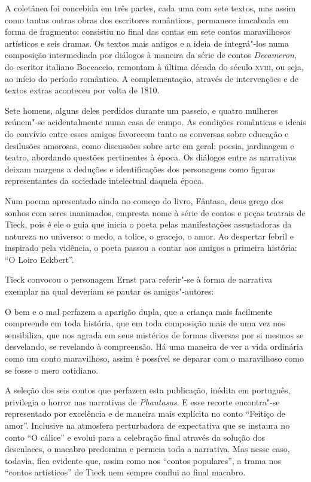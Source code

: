 A coletânea foi concebida em três partes, cada uma com sete textos,
mas assim como tantas outras obras dos escritores românticos, permanece
inacabada em forma de fragmento: consistiu no final das contas em sete
contos maravilhosos artísticos e seis dramas. Os textos mais antigos e a ideia de
integrá"-los numa composição intermediada por diálogos à maneira da
série de contos \textit{Decameron}, do escritor italiano Boccaccio,		
remontam à última década do século \textsc{xviii}, ou seja, 
ao início do período romântico. A complementação, através de 
intervenções e de textos extras aconteceu por volta de 1810. 

Sete homens, alguns deles perdidos durante um passeio, e quatro mulheres
reúnem"-se acidentalmente numa casa de campo. As condições românticas e
ideais do convívio entre esses amigos favorecem tanto as conversas
sobre educação e desilusões amorosas, como discussões sobre arte em
geral: poesia, jardinagem e teatro, abordando questões pertinentes à
época. Os diálogos entre as narrativas deixam margens a deduções e
identificações dos personagens como figuras representantes da sociedade
intelectual daquela época. 

Num poema apresentado ainda no começo do livro, Fântaso, deus grego dos
sonhos com seres inanimados, empresta nome à série de contos e peças
teatrais de Tieck, pois é ele o guia que inicia o poeta pelas
manifestações assustadoras da natureza no universo: o medo, a tolice, o
gracejo, o amor.  Ao despertar febril e inspirado pela vidência, o
poeta passou a contar aos amigos a primeira história: ``O Loiro Eckbert''.

Tieck convocou o personagem Ernst para referir"-se à forma de narrativa
exemplar na qual deveriam se pautar os amigos"-autores: 

\begin{hedraquote}
O bem e o mal perfazem a aparição dupla, que a criança mais facilmente
compreende em toda história, que em toda composição mais de uma vez nos
sensibiliza, que nos agrada em seus mistérios de formas diversas por si
mesmos se desvelando, se revelando à compreensão. Há uma maneira de ver
a vida \mbox{ordinária} como um conto maravilhoso, assim é possível se deparar
com o maravilhoso como se fosse o mero cotidiano.
\end{hedraquote}

A seleção dos seis contos que perfazem esta publicação, inédita em português,
privilegia o horror nas narrativas de 
\textit{Phantasus}. E esse recorte encontra"-se
representado por excelência e de maneira mais explícita no conto
``Feitiço de amor''. Inclusive na atmosfera perturbadora de expectativa que
se instaura no conto ``O cálice'' e evolui para a celebração final		
através da solução dos desenlaces, o macabro predomina e permeia toda a
narrativa. Mas nesse caso, todavia, fica evidente que, assim como nos
``contos populares'', a trama nos ``contos artísticos'' de Tieck nem sempre
conflui ao final macabro. 

